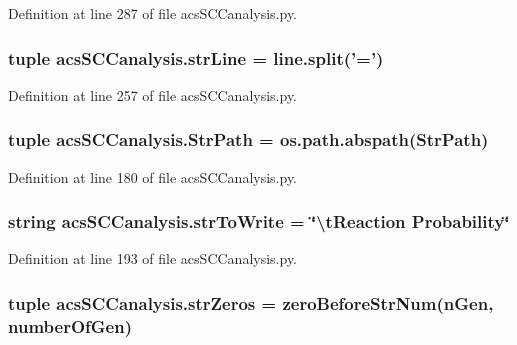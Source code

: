 Definition at line 287 of file acs\+S\+C\+Canalysis.\+py.

\hypertarget{a00130_a072631e11db72789389935b0f9efff8d}{
\subsubsection[{str\+Line}]{\setlength{\rightskip}{0pt plus 5cm}tuple acs\+S\+C\+Canalysis.\+str\+Line = {\bf line.\+split}('=')}}\label{a00130_a072631e11db72789389935b0f9efff8d}


Definition at line 257 of file acs\+S\+C\+Canalysis.\+py.

\hypertarget{a00130_af8add8b37a9c8a7825c0e8f0e7dfd6c1}{
\subsubsection[{Str\+Path}]{\setlength{\rightskip}{0pt plus 5cm}tuple acs\+S\+C\+Canalysis.\+Str\+Path = os.\+path.\+abspath(Str\+Path)}}\label{a00130_af8add8b37a9c8a7825c0e8f0e7dfd6c1}


Definition at line 180 of file acs\+S\+C\+Canalysis.\+py.

\hypertarget{a00130_a1966f0657c6b477eeb60bde732a201cc}{
\subsubsection[{str\+To\+Write}]{\setlength{\rightskip}{0pt plus 5cm}string acs\+S\+C\+Canalysis.\+str\+To\+Write = \char`\"{}\textbackslash{}t\+Reaction Probability\char`\"{}}}\label{a00130_a1966f0657c6b477eeb60bde732a201cc}


Definition at line 193 of file acs\+S\+C\+Canalysis.\+py.

\hypertarget{a00130_a8ba6aefb71b3d1e575eac38627f143d6}{
\subsubsection[{str\+Zeros}]{\setlength{\rightskip}{0pt plus 5cm}tuple acs\+S\+C\+Canalysis.\+str\+Zeros = {\bf zero\+Before\+Str\+Num}(n\+Gen, {\bf number\+Of\+Gen})}}\label{a00130_a8ba6aefb71b3d1e575eac38627f143d6}


